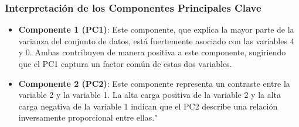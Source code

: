 \documentclass[journal]{IEEEtran}
\begin{document}
	
	\subsubsection{Interpretación de los Componentes Principales Clave}
	\begin{itemize}
		\item \textbf{Componente 1 (PC1)}: Este componente, que explica la mayor parte de la varianza del conjunto de datos, está fuertemente asociado con las variables 4 y 0. Ambas contribuyen de manera positiva a este componente, sugiriendo que el PC1 captura un factor común de estas dos variables.
		\item \textbf{Componente 2 (PC2)}: Este componente representa un contraste entre la variable 2 y la variable 1. La alta carga positiva de la variable 2 y la alta carga negativa de la variable 1 indican que el PC2 describe una relación inversamente proporcional entre ellas."
	\end{itemize}
	
\end{document}
